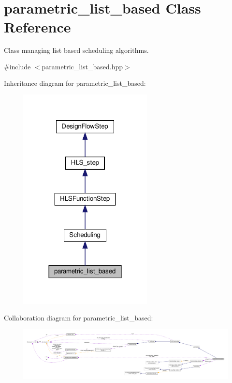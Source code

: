 \hypertarget{classparametric__list__based}{}\section{parametric\+\_\+list\+\_\+based Class Reference}
\label{classparametric__list__based}


Class managing list based scheduling algorithms.  




{\ttfamily \#include $<$parametric\+\_\+list\+\_\+based.\+hpp$>$}



Inheritance diagram for parametric\+\_\+list\+\_\+based\+:
\nopagebreak
\begin{figure}[H]
\begin{center}
\leavevmode
\includegraphics[width=192pt]{d8/db8/classparametric__list__based__inherit__graph}
\end{center}
\end{figure}


Collaboration diagram for parametric\+\_\+list\+\_\+based\+:
\nopagebreak
\begin{figure}[H]
\begin{center}
\leavevmode
\includegraphics[width=350pt]{df/d1f/classparametric__list__based__coll__graph}
\end{center}
\end{figure}
